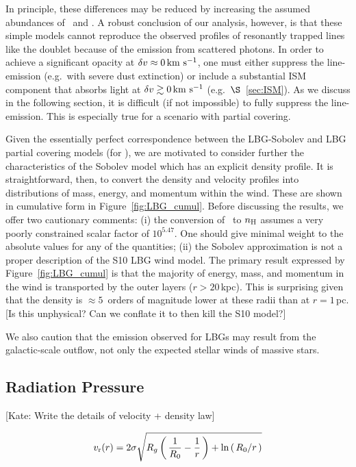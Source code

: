 \documentclass[12pt,preprint]{aastex}
\begin{document}
In principle, these differences may be reduced by increasing the
assumed abundances of \nmg\ and \nfe.  A robust conclusion of our
analysis, however, is that these simple models cannot reproduce the
observed profiles of resonantly trapped lines like the 
doublet because of the emission from scattered photons.  In order to
achieve a significant opacity at $\delta v \approx 0 \, {\rm km~s^{-1}}$, one must
either suppress the line-emission (e.g.\ with severe dust extinction) 
or include a substantial ISM component that absorbs light at $\delta v
\gtrsim 0 \, {\rm km~s^{-1}}$ (e.g.\ $\S$~\ref{sec:ISM}).  As we discuss in the
following section, it is difficult (if not impossible) to fully
suppress the line-emission.  This is especially true for a scenario
with partial covering.


Given the essentially perfect correspondence between the LBG-Sobolev and
LBG partial covering models (for \mgiia), we are motivated to consider
further the characteristics of the Sobolev model which has 
an explicit density profile.  It is straightforward, then, to convert the density and
velocity profiles into distributions of mass, energy, and momentum
within
the wind.  These are shown in cumulative form in
Figure~\ref{fig:LBG_cumul}.  Before discussing the results, we offer
two cautionary comments: (i) the conversion of \nmg\ to $n_{\rm H}$
assumes a very poorly constrained scalar factor of $10^{5.47}$.  One
should give minimal weight to the absolute values for any of the
quantities;
(ii) the Sobolev approximation is not a proper description of the S10
LBG wind model.
The primary result expressed by Figure~\ref{fig:LBG_cumul} is that the
majority of energy, mass, and momentum in the wind is transported by
the outer layers ($r > 20$\,kpc).  This is surprising given that the
density is $\approx 5$~orders of magnitude lower at these radii than
at $r = 1$\,pc.  [Is this unphysical?  Can we conflate it to then kill
the S10 model?]

We also caution that the  emission observed for LBGs
\citep[e.g.][]{prs+02} may result from the galactic-scale outflow, not
only the expected stellar winds of massive stars.

\subsection{Radiation Pressure}
\label{sec:radiative}

[Kate: Write the details of velocity + density law]

\begin{equation}
v_{\rm r}(r) = 2\sigma \sqrt{R_g \left ( \, \frac{1}{R_0} - \frac{1}{r} \, \right )
   + \ln\left ( \, R_0/r \, \right ) }
\end{equation}
\end{document}
